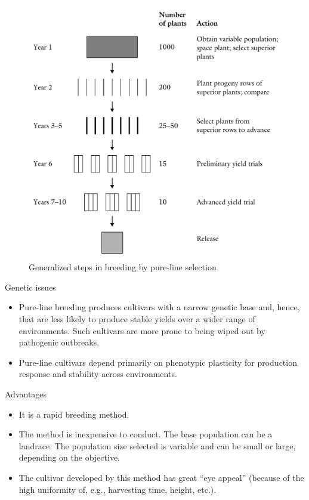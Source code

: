 \documentclass[11pt,dvipsnames,ignorenonframetext,aspectratio=169]{beamer}
\providecommand{\tightlist}{%
  \setlength{\itemsep}{0pt}\setlength{\parskip}{0pt}}
\begin{document}
\begin{frame}{}
\protect\hypertarget{section-9}{}
\begin{figure}

{\centering \includegraphics[width=0.45\linewidth]{../images/pureline_selection} 

}

\caption{Generalized steps in breeding by pure-line selection}\label{fig:pureline-selection}
\end{figure}
\end{frame}

\begin{frame}{Genetic issues}
\protect\hypertarget{genetic-issues}{}
\begin{itemize}
\tightlist
\item
  Pure-line breeding produces cultivars with a narrow genetic base and,
  hence, that are less likely to produce stable yields over a wider
  range of environments. Such cultivars are more prone to being wiped
  out by pathogenic outbreaks.
\item
  Pure-line cultivars depend primarily on phenotypic plasticity for
  production response and stability across environments.
\end{itemize}
\end{frame}

\begin{frame}{Advantages}
\protect\hypertarget{advantages}{}
\begin{itemize}
\tightlist
\item
  It is a rapid breeding method.
\item
  The method is inexpensive to conduct. The base population can be a
  landrace. The population size selected is variable and can be small or
  large, depending on the objective.
\item
  The cultivar developed by this method has great ``eye appeal''
  (because of the high uniformity of, e.g., harvesting time, height,
  etc.).
\end{itemize}
\end{frame}
\end{document}
